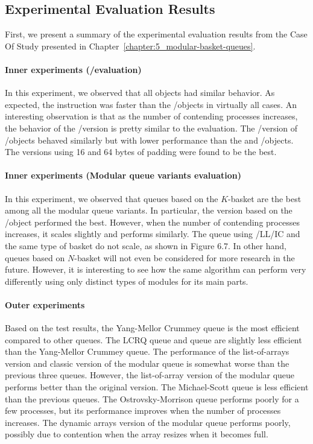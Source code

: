 \subsection{Experimental Evaluation Results}

First, we present a summary of the experimental evaluation results from the Case Of Study presented in Chapter~\ref{chapter:5_modular-basket-queues}.

\paragraph*{Inner experiments (\LL/\IC evaluation)}  In this experiment, we observed that all objects had similar behavior. As expected, the \FAI instruction was faster than the \LL/\IC objects in virtually all cases. An interesting observation is that as the number of contending processes increases, the behavior of the \LL/\IC \CAS version is pretty similar to the \FAI evaluation. The \R/\W version of \LL/\IC objects behaved similarly but with lower performance than the \FAI and \CAS \LL/\IC objects. The versions using 16 and 64 bytes of padding were found to be the best.

\paragraph*{Inner experiments (Modular queue variants evaluation)} In this experiment, we observed that queues based on the \(K\)-basket are the best among all the modular queue variants. In particular, the version based on the \CAS \LL/\IC object performed the best. However, when the number of contending processes increases, it scales slightly and performs similarly. The queue using \R/\W LL/IC and the same type of basket do not scale, as shown in Figure 6.7. In other hand, queues based on \(N\)-basket will not even be considered for more research in the future. However, it is interesting to see how the same algorithm can perform very differently using only distinct types of modules for its main parts.

\paragraph*{Outer experiments} Based on the test results, the Yang-Mellor Crummey queue is the most efficient compared to other queues. The LCRQ queue and \FAI queue are slightly less efficient than the Yang-Mellor Crummey queue. The performance of the list-of-arrays version and classic version of the modular queue is somewhat worse than the previous three queues. However, the list-of-array version of the modular queue performs better than the original version. The Michael-Scott queue is less efficient than the previous queues. The Ostrovsky-Morrison queue performs poorly for a few processes, but its performance improves when the number of processes increases. The dynamic arrays version of the modular queue performs poorly, possibly due to contention when the array resizes when it becomes full.

